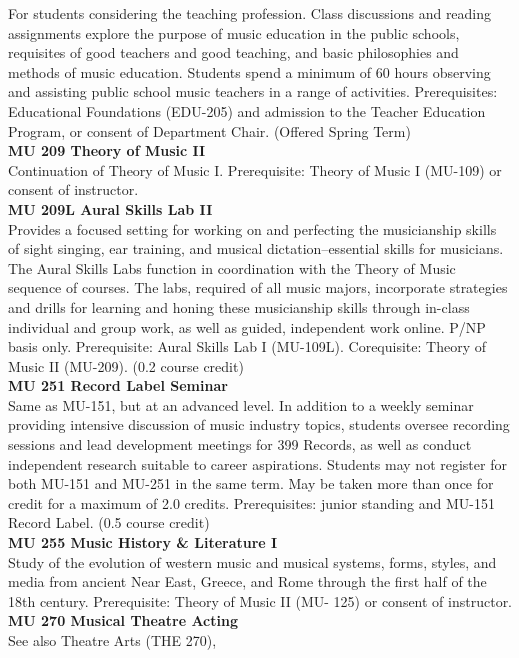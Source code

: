 \documentclass[
  letterpaper,
]{scrbook}
\begin{document}
For students considering the teaching profession. Class discussions and
reading assignments explore the purpose of music education in the public
schools, requisites of good teachers and good teaching, and basic
philosophies and methods of music education. Students spend a minimum of
60 hours observing and assisting public school music teachers in a range
of activities. Prerequisites: Educational Foundations (EDU-205) and
admission to the Teacher Education Program, or consent of Department
Chair. (Offered Spring Term)\\
\textbf{MU 209 Theory of Music II}\\
Continuation of Theory of Music I. Prerequisite: Theory of Music I
(MU-109) or consent of instructor.\\
\textbf{MU 209L Aural Skills Lab II}\\
Provides a focused setting for working on and perfecting the
musicianship skills of sight singing, ear training, and musical
dictation--essential skills for musicians. The Aural Skills Labs
function in coordination with the Theory of Music sequence of courses.
The labs, required of all music majors, incorporate strategies and
drills for learning and honing these musicianship skills through
in-class individual and group work, as well as guided, independent work
online. P/NP basis only. Prerequisite: Aural Skills Lab I (MU-109L).
Corequisite: Theory of Music II (MU-209). (0.2 course credit)\\
\textbf{MU 251 Record Label Seminar}\\
Same as MU-151, but at an advanced level. In addition to a weekly
seminar providing intensive discussion of music industry topics,
students oversee recording sessions and lead development meetings for
399 Records, as well as conduct independent research suitable to career
aspirations. Students may not register for both MU-151 and MU-251 in the
same term. May be taken more than once for credit for a maximum of 2.0
credits. Prerequisites: junior standing and MU-151 Record Label. (0.5
course credit)\\
\textbf{MU 255 Music History \& Literature I}\\
Study of the evolution of western music and musical systems, forms,
styles, and media from ancient Near East, Greece, and Rome through the
first half of the 18th century. Prerequisite: Theory of Music II (MU-
125) or consent of instructor.\\
\textbf{MU 270 Musical Theatre Acting}\\
See also Theatre Arts (THE 270),
\end{document}
